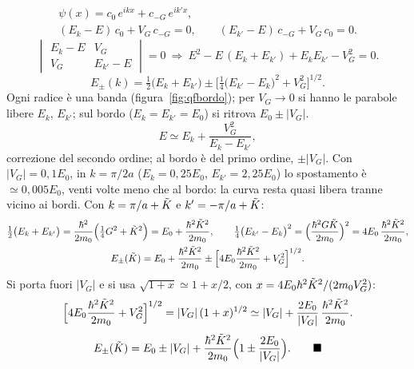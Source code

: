 \documentclass[11pt,a4paper]{article}
\begin{document}
\begin{dimostrazione}
\begin{gather*}
\psi(x)=c_0\,e^{ikx}+c_{-G}\,e^{ik'x},\\
(E_k-E)\,c_0+V_G\,c_{-G}=0,\qquad(E_{k'}-E)\,c_{-G}+V_G\,c_0=0 .
\end{gather*}
\[
\begin{vmatrix}E_k-E&V_G\\V_G&E_{k'}-E\end{vmatrix}=0
\ \Longrightarrow\ E^2-E\,(E_k+E_{k'})+E_kE_{k'}-V_G^2=0 .
\]
\begin{equation}\label{eq:dueonde}
E_\pm(k)=\tfrac12\bigl(E_k+E_{k'}\bigr)\pm\Big[\tfrac14\bigl(E_{k'}-E_k\bigr)^2+V_G^2\Big]^{1/2}.
\end{equation}
Ogni radice è una banda (figura~\ref{fig:qfbordo}); per $V_G\to0$ si hanno le parabole libere $E_k$, $E_{k'}$; sul bordo ($E_k=E_{k'}=E_0$) si ritrova $E_0\pm|V_G|$.
\[
E\simeq E_k+\frac{V_G^2}{E_k-E_{k'}} ,
\]
correzione del secondo ordine; al bordo è del primo ordine, $\pm|V_G|$. Con $|V_G|=0{,}1E_0$, in $k=\pi/2a$ ($E_k=0{,}25E_0$, $E_{k'}=2{,}25E_0$) lo
spostamento è $\simeq0{,}005E_0$, venti volte meno che al bordo: la curva resta quasi libera tranne vicino ai bordi.
Con $k=\pi/a+\tilde K$ e $k'=-\pi/a+\tilde K$:
\begin{gather*}
\tfrac12\bigl(E_k+E_{k'}\bigr)=\frac{\hbar^2}{2m_0}\Bigl(\tfrac14G^2+\tilde K^2\Bigr)=E_0+\frac{\hbar^2\tilde K^2}{2m_0},\qquad
\tfrac14\bigl(E_{k'}-E_k\bigr)^2=\Bigl(\frac{\hbar^2G\tilde K}{2m_0}\Bigr)^2=4E_0\,\frac{\hbar^2\tilde K^2}{2m_0},\\
E_\pm(\tilde K)=E_0+\frac{\hbar^2\tilde K^2}{2m_0}\pm\Bigl[4E_0\frac{\hbar^2\tilde K^2}{2m_0}+V_G^2\Bigr]^{1/2}.
\end{gather*}
Si porta fuori $|V_G|$ e si usa $\sqrt{1+x}\simeq1+x/2$, con $x=4E_0\hbar^2\tilde K^2/(2m_0V_G^2)$:
\[
\Bigl[4E_0\frac{\hbar^2\tilde K^2}{2m_0}+V_G^2\Bigr]^{1/2}=|V_G|\,(1+x)^{1/2}\simeq|V_G|+\frac{2E_0}{|V_G|}\,\frac{\hbar^2\tilde K^2}{2m_0}.
\]
\begin{equation}\label{eq:parab}
E_\pm(\Kt)=E_0\pm|V_G|+\frac{\hbar^2\Kt^2}{2m_0}\Bigl(1\pm\frac{2E_0}{|V_G|}\Bigr).\qed
\end{equation}
\end{dimostrazione}
\end{document}
